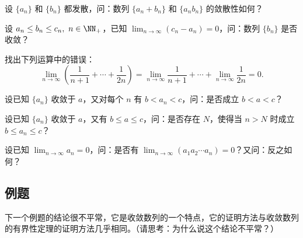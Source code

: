 \begin{xthought}[2]
设 $\{a_n\}$ 和 $\{b_n\}$ 都发散，问：数列 $\{a_n+b_n\}$ 和 $\{a_nb_n\}$ 的敛散性如何？
\end{xthought}

\begin{xthought}[3]
设 $a_n\le b_n\le c_n,\ n\in\NN_+$，已知 $\displaystyle\lim_{n\to\infty}(c_n-a_n)=0$，问：数列 $\{b_n\}$ 是否收敛？
\end{xthought}

\begin{xthought}[4]
找出下列运算中的错误：
  \[
    \lim_{n\to\infty}\left(\frac1{n+1}+\cdots+\frac1{2n}\right)
    =\lim_{n\to\infty}\frac1{n+1}+\cdots+\lim_{n\to\infty}\frac1{2n}=0.
  \]
\end{xthought}

\begin{xthought}[5]
设已知 $\{a_n\}$ 收敛于 $a$，又对每个 $n$ 有 $b<a_n<c$，问：是否成立 $b<a<c$？
\end{xthought}

\begin{xthought}[6]
设已知 $\{a_n\}$ 收敛于 $a$，又有 $b\le a\le c$，问：是否存在 $N$，使得当 $n>N$ 时成立 $b\le a_n\le c$？
\end{xthought}

\begin{xthought}[7]
设已知 $\displaystyle\lim_{n\to\infty}a_n=0$，问：是否有 $\displaystyle\lim_{n\to\infty}(a_1a_2\cdots a_n)=0$？又问：反之如何？
\end{xthought}

\subsection{例题}

下一个例题的结论很不平常，它是收敛数列的一个特点，它的证明方法与收敛数列的有界性定理的证明方法几乎相同。（请思考：为什么说这个结论不平常？）

